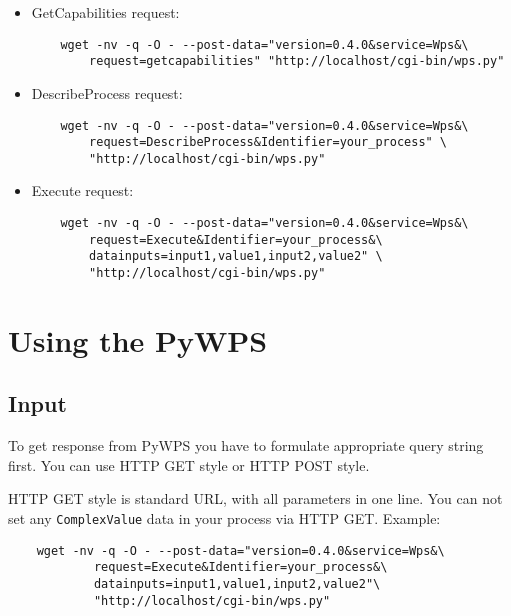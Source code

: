 \documentclass[a4paper,11pt]{article}
\begin{document}
    \begin{itemize}
        \item GetCapabilities request:
\begin{verbatim}
    wget -nv -q -O - --post-data="version=0.4.0&service=Wps&\
        request=getcapabilities" "http://localhost/cgi-bin/wps.py"
\end{verbatim}
         
        \item DescribeProcess request:
\begin{verbatim}
    wget -nv -q -O - --post-data="version=0.4.0&service=Wps&\
        request=DescribeProcess&Identifier=your_process" \
        "http://localhost/cgi-bin/wps.py"
\end{verbatim}
         
        \item Execute request:
\begin{verbatim}
    wget -nv -q -O - --post-data="version=0.4.0&service=Wps&\
        request=Execute&Identifier=your_process&\
        datainputs=input1,value1,input2,value2" \
        "http://localhost/cgi-bin/wps.py"
\end{verbatim}
         
    \end{itemize}

    
    \section{Using the PyWPS}
    \subsection{Input}
     
    To get response from PyWPS you have to formulate appropriate query string first. You can use HTTP GET style or HTTP POST style.
     
     
    HTTP GET style is standard URL, with all parameters in one line. You can not set any \texttt{ComplexValue} data in your process via HTTP GET. Example:
     
    \begin{verbatim}
    wget -nv -q -O - --post-data="version=0.4.0&service=Wps&\
            request=Execute&Identifier=your_process&\
            datainputs=input1,value1,input2,value2"\
            "http://localhost/cgi-bin/wps.py"
    \end{verbatim}
     
\end{document}
